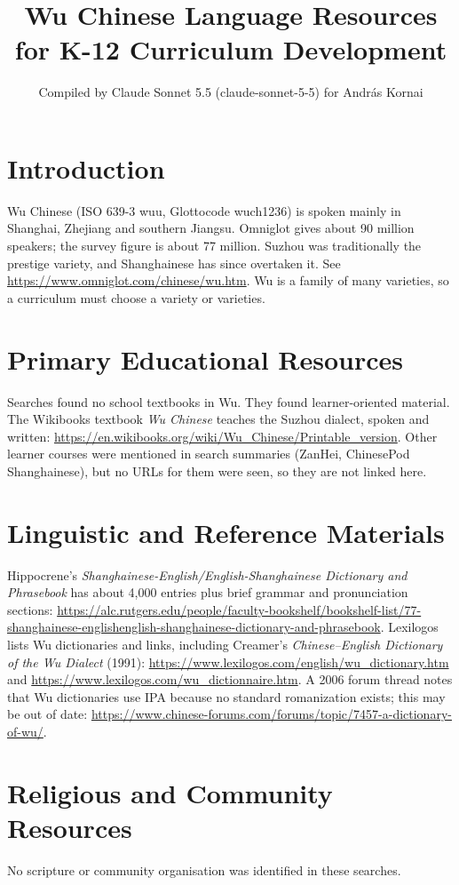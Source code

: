 \documentclass[12pt]{article}
\title{Wu Chinese Language Resources for K-12 Curriculum Development}
\author{Compiled by Claude Sonnet 5.5 (claude-sonnet-5-5) for Andr\'as Kornai}
\date{}
\begin{document}
\maketitle

\section{Introduction}
Wu Chinese (ISO 639-3 wuu, Glottocode wuch1236) is spoken mainly in Shanghai, Zhejiang and southern Jiangsu. Omniglot gives about 90 million speakers; the survey figure is about 77 million. Suzhou was traditionally the prestige variety, and Shanghainese has since overtaken it. See \url{https://www.omniglot.com/chinese/wu.htm}. Wu is a family of many varieties, so a curriculum must choose a variety or varieties.

\section{Primary Educational Resources}
Searches found no school textbooks in Wu. They found learner-oriented material. The Wikibooks textbook \emph{Wu Chinese} teaches the Suzhou dialect, spoken and written: \url{https://en.wikibooks.org/wiki/Wu_Chinese/Printable_version}. Other learner courses were mentioned in search summaries (ZanHei, ChinesePod Shanghainese), but no URLs for them were seen, so they are not linked here.

\section{Linguistic and Reference Materials}
Hippocrene's \emph{Shanghainese-English/English-Shanghainese Dictionary and Phrasebook} has about 4,000 entries plus brief grammar and pronunciation sections: \url{https://alc.rutgers.edu/people/faculty-bookshelf/bookshelf-list/77-shanghainese-englishenglish-shanghainese-dictionary-and-phrasebook}. Lexilogos lists Wu dictionaries and links, including Creamer's \emph{Chinese--English Dictionary of the Wu Dialect} (1991): \url{https://www.lexilogos.com/english/wu_dictionary.htm} and \url{https://www.lexilogos.com/wu_dictionnaire.htm}. A 2006 forum thread notes that Wu dictionaries use IPA because no standard romanization exists; this may be out of date: \url{https://www.chinese-forums.com/forums/topic/7457-a-dictionary-of-wu/}.

\section{Religious and Community Resources}
No scripture or community organisation was identified in these searches.
\end{document}
